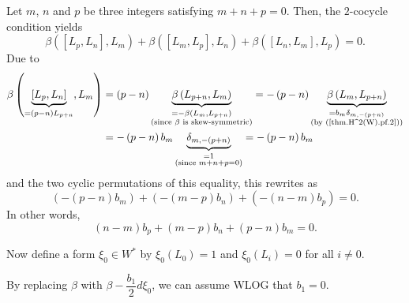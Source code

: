 \documentclass[etingof-lie.tex]{subfiles}
\begin{document}
Let $m$, $n$ and $p$ be three integers satisfying $m+n+p=0$. Then, the
$2$-cocycle condition yields%
\[
\beta\left(  \left[  L_{p},L_{n}\right]  ,L_{m}\right)  +\beta\left(  \left[
L_{m},L_{p}\right]  ,L_{n}\right)  +\beta\left(  \left[  L_{n},L_{m}\right]
,L_{p}\right)  =0.
\]
Due to%
\begin{align*}
\beta\left(  \underbrace{\left[  L_{p},L_{n}\right]  }_{=\left(  p-n\right)
L_{p+n}},L_{m}\right)   &  =\left(  p-n\right)  \underbrace{\beta\left(
L_{p+n},L_{m}\right)  }_{\substack{=-\beta\left(  L_{m},L_{p+n}\right)
\\\text{(since }\beta\text{ is skew-symmetric)}}}=-\left(  p-n\right)
\underbrace{\beta\left(  L_{m},L_{p+n}\right)  }_{\substack{=b_{m}%
\delta_{m,-\left(  p+n\right)  }\\\text{(by (\ref{thm.H^2(W).pf.2}))}}}\\
&  =-\left(  p-n\right)  b_{m}\underbrace{\delta_{m,-\left(  p+n\right)  }%
}_{\substack{=1\\\text{(since }m+n+p=0\text{)}}}=-\left(  p-n\right)  b_{m}%
\end{align*}
and the two cyclic permutations of this equality, this rewrites as%
\[
\left(  -\left(  p-n\right)  b_{m}\right)  +\left(  -\left(  m-p\right)
b_{n}\right)  +\left(  -\left(  n-m\right)  b_{p}\right)  =0.
\]
In other words,%
\begin{equation}
\left(  n-m\right)  b_{p}+\left(  m-p\right)  b_{n}+\left(  p-n\right)
b_{m}=0. \label{thm.H^2(W).pf.3}%
\end{equation}


Now define a form $\xi_{0}\in W^{\ast}$ by $\xi_{0}\left(  L_{0}\right)  =1$
and $\xi_{0}\left(  L_{i}\right)  =0$ for all $i\neq0$.

By replacing $\beta$ with $\beta-\dfrac{b_{1}}{2}d\xi_{0}$, we can assume WLOG
that $b_{1}=0$.
\end{document}
